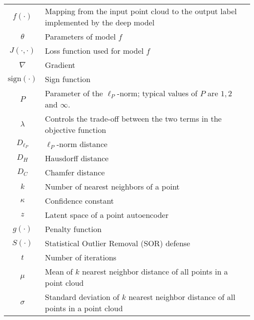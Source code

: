 \documentclass{ieeeaccess}
\newcommand{\sign}{\text{sign}}
\begin{document}
\begin{table*}
\begin{tabular}{| c  | l |  }
$f(\cdot)$ & Mapping from the input point cloud to the output label implemented by the deep model  \\

$\theta$ & Parameters of model $f$  \\

$J(\cdot,\cdot)$ & Loss function used for model $f$  \\ 

$\nabla$ & Gradient \\

$\sign(\cdot)$ & Sign function \\

$P$ &  Parameter of the $\ell_P$-norm; typical values of $P$ are $1,2$ and $\infty$. \\

$\lambda$ &  Controls the trade-off between the two terms in the objective function \\


$D_{\ell_P}$ & $\ell_P$-norm distance \\
$D_{H}$ & Hausdorff distance \\

$D_{C}$ & Chamfer distance \\

 $k$ & Number of nearest neighbors of a point\\

 $\kappa$ & Confidence constant %
 \\

$z$ & Latent space of a point autoencoder\\
$g(\cdot)$ & Penalty function \\
$S(\cdot)$ & Statistical Outlier Removal (SOR) defense \\
$t$ & Number of iterations %
\\
$\mu$ & Mean of $k$ nearest neighbor distance of all points in a point cloud \\
$\sigma$ & Standard deviation of $k$ nearest neighbor distance of all points in a point cloud\\



\hline
\end{tabular}

\end{table*}
\end{document}
